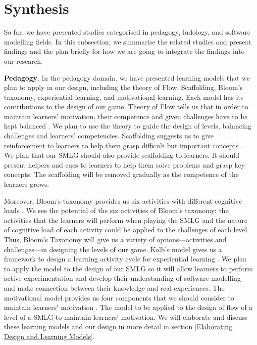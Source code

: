 \documentclass[12pt, a4paper]{report}
\begin{document}
{\section{Synthesis}
\label{Synthesis}
So far, we have presented studies categorised in pedagogy, ludology, and software modelling fields. In this subsection, we summarise the related studies and present findings and the plan briefly for how we are going to integrate the findings into our research.     

\textbf{Pedagogy}. In the pedagogy domain, we have presented learning models that we plan to apply in our design, including the theory of Flow, Scaffolding, Bloom's taxonomy, experiential learning, and motivational learning. Each model has its contributions to the design of our game. Theory of Flow tells us that in order to maintain learners' motivation, their competence and given challenges have to be kept balanced \cite{csikszentmihalyi2014toward}. We plan to use the theory to guide the design of levels, balancing challenges and learners' competencies. Scaffolding suggests us to give reinforcement to learners to help them grasp difficult but important concepts \cite{wood1976role, vygotsky1978mind}. We plan that our SMLG should also provide scaffolding to learners. It should present helpers and cues to learners to help them solve problems and grasp key concepts. The scaffolding will be removed gradually as the competence of the learners grows. 

Moreover, Bloom's taxonomy provides us six activities with different cognitive loads \cite{krathwohl2002revision}. We see the potential of the six activities of Bloom's taxonomy: the activities that the learners will perform when playing the SMLG and the nature of cognitive load of each activity could be applied to the challenges of each level. Thus, Bloom's Taxonomy will give us a variety of options---activities and challenges---in designing the levels of our game. Kolb's model gives us a framework to design a learning activity cycle for experiential learning \cite{kolb2014experiential}. We plan to apply the model to the design of our SMLG so it will allow learners to perform active experimentation and develop their understanding of software modelling and make connection between their knowledge and real experiences. The motivational model provides us four components that we should consider to maintain learners' motivation \cite{keller2010motivational}. The model to be applied to the design of flow of a level of a SMLG to maintain learners' motivation. We will elaborate and discuss these learning models and our design in more detail in section \ref{Elaborating Design and Learning Models}. 

}
\end{document}
